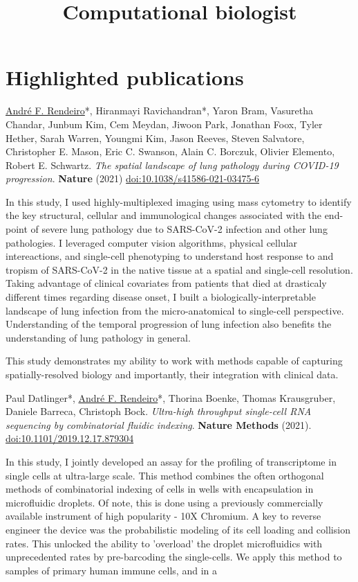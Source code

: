 \documentclass[11pt,a4paper,roman]{moderncv} %
\title{Computational biologist}
\begin{document}
\makecvtitle %

\section{Highlighted publications}

\begin{list}{--}{}
    \item{}
        {\underline{André F. Rendeiro}*, Hiranmayi Ravichandran*, Yaron Bram, Vasuretha Chandar, Junbum Kim, Cem Meydan, Jiwoon Park, Jonathan Foox, Tyler Hether, Sarah Warren, Youngmi Kim, Jason Reeves, Steven Salvatore, Christopher E. Mason, Eric C. Swanson, Alain C. Borczuk, Olivier Elemento, Robert E. Schwartz. \textit{The spatial landscape of lung pathology during COVID-19 progression}. \textbf{Nature} (2021) \href{https://dx.doi.org/10.1038/s41586-021-03475-6}{doi:10.1038/s41586-021-03475-6}}

        In this study, I used highly-multiplexed imaging using mass cytometry to identify the key structural, cellular and immunological changes associated with the end-point of severe lung pathology due to SARS-CoV-2 infection and other lung pathologies. I leveraged computer vision algorithms, physical cellular intereactions, and single-cell phenotyping to understand host response to and tropism of SARS-CoV-2 in the native tissue at a spatial and single-cell resolution. Taking advantage of clinical covariates from patients that died at drasticaly different times regarding disease onset, I built a biologically-interpretable landscape of lung infection from the micro-anatomical to single-cell perspective. Understanding of the temporal progression of lung infection also benefits the understanding of lung pathology in general.

        This study demonstrates my ability to work with methods capable of capturing spatially-resolved biology and importantly, their integration with clinical data.

    \item{}{
        Paul Datlinger*, \underline{André F. Rendeiro}*, Thorina Boenke, Thomas Krausgruber, Daniele Barreca, Christoph Bock. \textit{Ultra-high throughput single-cell RNA sequencing by combinatorial fluidic indexing}. \textbf{Nature Methods} (2021). \href{https://dx.doi.org/10.1101/2019.12.17.879304}{doi:10.1101/2019.12.17.879304}}

        In this study, I jointly developed an assay for the profiling of transcriptome in single cells at ultra-large scale. This method combines the often orthogonal methods of combinatorial indexing of cells in wells with encapsulation in microfluidic droplets. Of note, this is done using a previously commercially available instrument of high popularity - 10X Chromium. A key to reverse engineer the device was the probabilistic modeling of its cell loading and collision rates. This unlocked the ability to 'overload' the droplet microfluidics with unprecedented rates by pre-barcoding the single-cells. We apply this method to samples of primary human immune cells, and in a 


\end{list}
\end{document}

